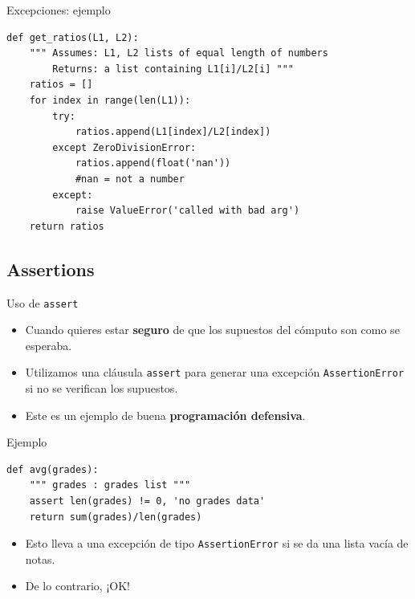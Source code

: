 \documentclass[mathserif]{beamer}
\begin{document}
\begin{frame}[fragile]{Excepciones: ejemplo}
\begin{lstlisting}
def get_ratios(L1, L2):
    """ Assumes: L1, L2 lists of equal length of numbers
        Returns: a list containing L1[i]/L2[i] """
    ratios = []
    for index in range(len(L1)):
        try:
            ratios.append(L1[index]/L2[index])
        except ZeroDivisionError:
            ratios.append(float('nan'))
            #nan = not a number
        except:
            raise ValueError('called with bad arg')
    return ratios
\end{lstlisting}
\end{frame}



\subsection{Assertions}

\begin{frame}[fragile]{Uso de \lstinline|assert|}
    \begin{itemize}
        \item Cuando quieres estar {\blue\bfseries seguro} de que los supuestos del cómputo son como se esperaba.
        
        \item Utilizamos una cláusula \lstinline|assert| para generar una excepción \lstinline|AssertionError| si no se verifican los supuestos.
        
        \item Este es un ejemplo de buena {\blue\bfseries programación defensiva}.
    \end{itemize}
\end{frame}

\begin{frame}[fragile]{Ejemplo}
\begin{lstlisting}
def avg(grades):
    """ grades : grades list """
    assert len(grades) != 0, 'no grades data'
    return sum(grades)/len(grades)
\end{lstlisting}

    \begin{itemize}
        \item Esto lleva a una excepción de tipo \lstinline|AssertionError| si se da una lista vacía de notas.
        
        \item De lo contrario, ¡OK!
    \end{itemize}
\end{frame}
\end{document}
